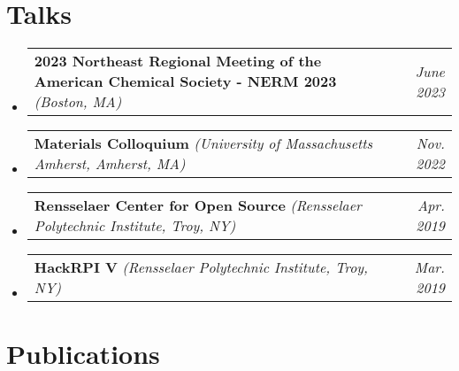 \documentclass[letterpaper,11pt]{article}
\makeatletter
\newcommand{\presentation}[3]{
    \vspace{-2pt}
    \scriptsize
    \item[]
    \begin{tabularx}{\textwidth}{l@{\extracolsep{\fill}}r}
        \textbf{#1} \textit{(#2)} & \textit{#3} \\
    \end{tabularx}\vspace{-12pt}
}
\makeatother
\begin{document}
\section{Talks}
    \vspace{4pt}
    \begin{itemize}[leftmargin=0pt]
        \presentation{2023 Northeast Regional Meeting of the American Chemical Society - NERM 2023}{Boston, MA}{June 2023}
        \presentation{Materials Colloquium}{University of Massachusetts Amherst, Amherst, MA}{Nov. 2022}
        \presentation{Rensselaer Center for Open Source}{Rensselaer Polytechnic Institute, Troy, NY}{Apr. 2019}
        \presentation{HackRPI V}{Rensselaer Polytechnic Institute, Troy, NY}{Mar. 2019}
    \end{itemize}
    
\nocite{*}
\section{Publications}
\printbibliography[heading=none]
\end{document}
